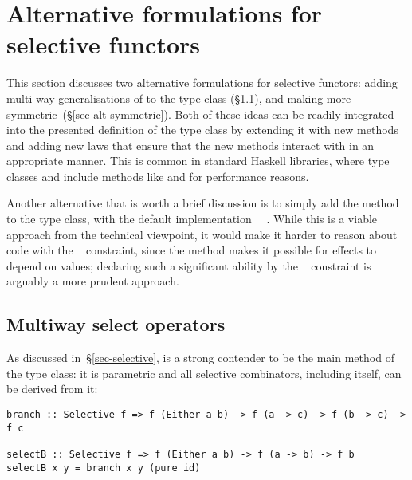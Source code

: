 \section{Alternative formulations for selective functors}
\label{sec-alternatives}

This section discusses two alternative formulations for selective functors:
adding multi-way generalisations of  to the  type
class (\S\ref{sec-alt-multi}), and making  more
symmetric~(\S\ref{sec-alt-symmetric}). Both of these ideas can be readily
integrated into the presented definition of the  type class by
extending it with new methods and adding new laws that ensure that the
new methods interact with  in an appropriate manner. This is common
in standard Haskell libraries, where type classes  and
 include methods like \hs{*>} and \hs{>>} for performance reasons.


Another alternative that is worth a brief discussion is to simply add the
 method to the  type class, with the default
implementation ~\hs{=}~. While this is a viable approach
from the technical viewpoint, it would make it harder to reason about code with
the ~ constraint, since the  method makes it
possible for effects to depend on values; declaring such a significant ability
by the ~ constraint is arguably a more prudent approach.

\subsection{Multiway select operators}\label{sec-alt-multi}

As discussed in~\S\ref{sec-selective},  is a strong contender to be
the main method of the  type class: it is parametric and all
selective combinators, including  itself, can be derived from it:

\vspace{1mm}
\begin{verbatim}
branch :: Selective f => f (Either a b) -> f (a -> c) -> f (b -> c) -> f c

selectB :: Selective f => f (Either a b) -> f (a -> b) -> f b
selectB x y = branch x y (pure id)
\end{verbatim}
\vspace{1mm}

